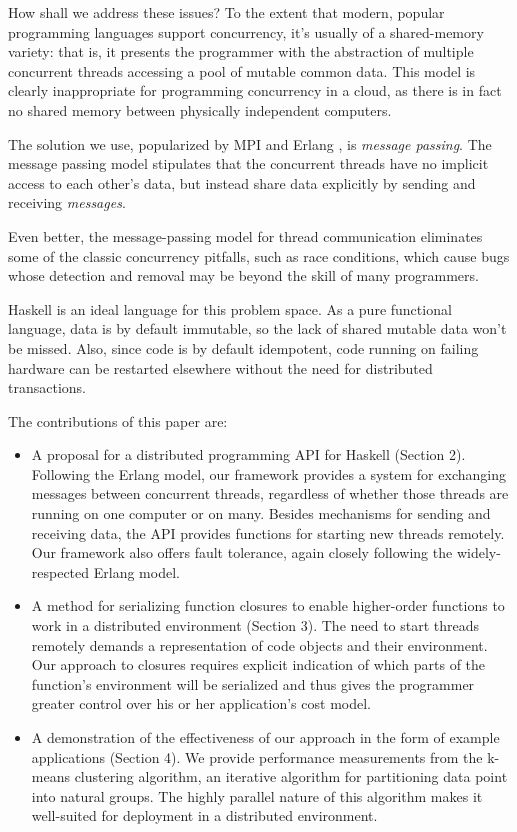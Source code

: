 \documentclass[preprint]{sigplanconf}
\begin{document}
How shall we address these issues? To the extent that modern, popular programming languages support concurrency, it's usually of a shared-memory variety: that is, it presents the programmer with the abstraction of multiple concurrent threads accessing a pool of mutable common data. This model is clearly inappropriate for programming concurrency in a cloud, as there is in fact no shared memory between physically independent computers.

The solution we use, popularized by MPI \cite{mpi99} and Erlang \cite{Erlang93}, is {\em message passing}. The message passing model stipulates that the concurrent threads have no implicit access to each other's data, but instead share data explicitly by sending and receiving {\em messages}. 

Even better, the message-passing model for thread communication eliminates some of the classic concurrency pitfalls, such as race conditions, which cause bugs whose detection and removal may be beyond the skill of many programmers. 

Haskell is an ideal language for this problem space. As a pure functional language, data is by default immutable, so the lack of shared mutable data won't be missed. Also, since code is by default idempotent, code running on failing hardware can be restarted elsewhere without the need for distributed transactions.

The contributions of this paper are:

\begin{itemize}
\item A proposal for a distributed programming API for Haskell (Section 2). Following the Erlang model, our framework provides a system for exchanging messages between concurrent threads, regardless of whether those threads are running on one computer or on many. Besides mechanisms for sending and receiving data, the API provides functions for starting new threads remotely. Our framework also offers fault tolerance, again closely following the widely-respected Erlang model.
\item A method for serializing function closures to enable higher-order functions to work in a distributed environment (Section 3). The need to start threads remotely demands a representation of code objects and their environment. Our approach to closures requires explicit indication of which parts of the function's environment will be serialized and thus gives the programmer greater control over his or her application's cost model.
\item A demonstration of the effectiveness of our approach in the form of example applications (Section 4). We provide performance measurements from the k-means clustering algorithm, an iterative algorithm for partitioning data point into natural groups. The highly parallel nature of this algorithm makes it well-suited for deployment in a distributed environment.
\end{itemize}
\end{document}
